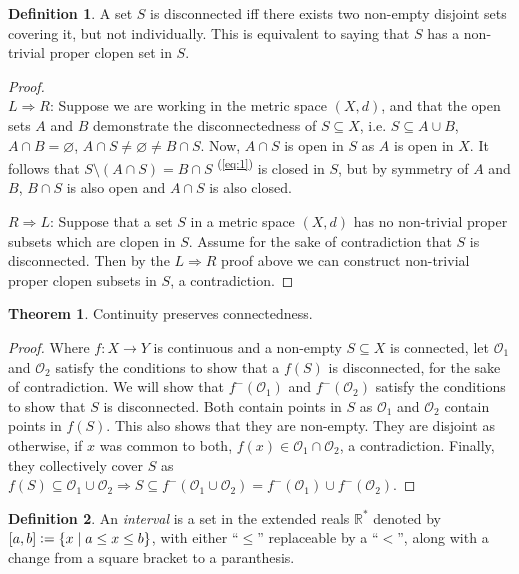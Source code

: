 \documentclass{article}
\newcommand{\sref}[1]{\textsuperscript{(\ref{#1})}}
\newcommand{\vc}{\vcentcolon}
\theoremstyle{definition}
\newtheorem{thm}{Theorem}[subsubsection]
\newtheorem{defn}{Definition}[subsubsection]
\begin{document}
\begin{defn}
	A set $S$ is disconnected iff there exists two non-empty disjoint sets covering it, but not individually. This is equivalent to saying that $S$ has a non-trivial proper clopen set in $S$.
\end{defn}
\begin{proof}
	$ $\\$L\Rightarrow R$:
	Suppose we are working in the metric space $(X,d)$, and that the open sets $A$ and $B$ demonstrate the disconnectedness of $S\subseteq X$, i.e. $S\subseteq A\cup B$, $A\cap B=\varnothing$, $A\cap S\not=\varnothing\not=B\cap S$.
	Now, $A\cap S$ is open in $S$ as $A$ is open in $X$. It follows that $S\setminus (A\cap S)=B\cap S$ \sref{eq:1}\label{ap1}
	is closed in $S$, but by symmetry of $A$ and $B$, $B\cap S$ is also open and $A\cap S$ is also closed.\par

	$R\Rightarrow L$:
	Suppose that a set $S$ in a metric space $(X,d)$ has no non-trivial proper subsets which are clopen in $S$. Assume for the sake of contradiction that $S$ is disconnected. Then by the $L\Rightarrow R$ proof above we can construct non-trivial proper clopen subsets in $S$, a contradiction.
\end{proof}
\begin{thm}
	Continuity preserves connectedness.
\end{thm}
\begin{proof}
	Where $f:X\rightarrow Y$ is continuous and a non-empty $S\subseteq X$ is connected, let $\mathcal{O}_1$ and $\mathcal{O}_2$ satisfy the conditions to show that a $f(S)$ is disconnected, for the sake of contradiction. We will show that $f^-(\mathcal{O}_1)$ and $f^-(\mathcal{O}_2)$ satisfy the conditions to show that $S$ is disconnected.
	Both contain points in $S$ as $\mathcal{O}_1$ and $\mathcal{O}_2$ contain points in $f(S)$. This also shows that they are non-empty. 
	They are disjoint as otherwise, if $x$ was common to both, $f(x)\in \mathcal{O}_1\cap\mathcal{O}_2$, a contradiction.
	Finally, they collectively cover $S$ as $f(S)\subseteq \mathcal{O}_1\cup \mathcal{O}_2\Rightarrow S\subseteq f^-(\mathcal{O}_1\cup \mathcal{O}_2)=f^-(\mathcal{O}_1)\cup f^-(\mathcal{O}_2)$.
\end{proof}
\begin{defn}
	An \emph{interval} is a set in the extended reals $\mathbb{R}^*$ denoted by $[a,b]\vc=\{x\mid a\leq x\leq b\}$, with either ``$\leq$'' replaceable by a ``$<$'', along with a change from a square bracket to a paranthesis.
\end{defn}
\end{document}

